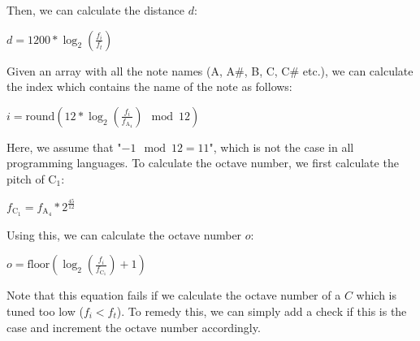 \documentclass[10pt,twocolumn]{article}
\begin{document}
Then, we can calculate the distance $d$:
\begin{center}
    $d = 1200 * \log_2(\frac{f_i}{f_t})$
\end{center}
Given an array with all the note names (A, A\#, B, C, C\# etc.), we can calculate the index which contains the name of the note as follows:
\begin{center}
    $i = \text{round}(12 * \log_2(\frac{f_i}{f_{\text{A}_4}}) \mod 12)$
\end{center}
Here, we assume that "$-1 \mod 12 = 11$", which is not the case in all programming languages. To calculate the octave number, we first calculate the pitch of $\text{C}_1$:
\begin{center}
    $f_{\text{C}_1} = f_{\text{A}_4} * 2^{\frac{45}{12}}$
\end{center}
Using this, we can calculate the octave number $o$:
\begin{center}
    $o = \text{floor}(\log_2(\frac{f_i}{f_{\text{C}_1}}) + 1)$
\end{center}
Note that this equation fails if we calculate the octave number of a $C$ which is tuned too low ($f_i < f_t$). To remedy this, we can simply add a check if this is the case and increment the octave number accordingly.
%
\end{document}
